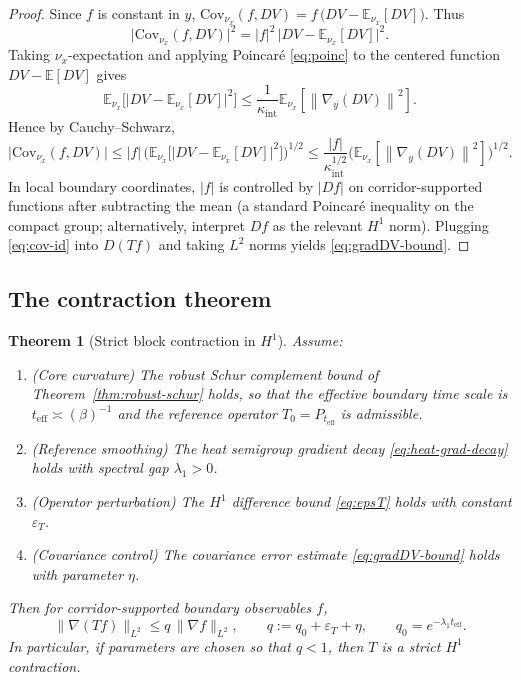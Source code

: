 \documentclass[11pt]{article}
\newtheorem{theorem}{Theorem}[section]
\theoremstyle{definition}
\newcommand{\E}{\mathbb{E}}
\newcommand{\Cov}{\mathrm{Cov}}
\newcommand{\1}{\mathbf{1}}
\newcommand{\norm}[1]{\left\lVert#1\right\rVert}
\begin{document}
\begin{proof}
Since $f$ is constant in $y$, $\Cov_{\nu_x}(f, DV)=f\,\big(DV-\E_{\nu_x}[DV]\big)$.
Thus
\[
\big|\Cov_{\nu_x}(f,DV)\big|^2
=|f|^2\,\big|DV-\E_{\nu_x}[DV]\big|^2.
\]
Taking $\nu_x$-expectation and applying Poincar\'e \eqref{eq:poinc} to the centered function $DV-\E[DV]$ gives
\[
\E_{\nu_x}\big[\big|DV-\E_{\nu_x}[DV]\big|^2\big]
\le \frac{1}{\kappa_{\mathrm{int}}}\E_{\nu_x}[\norm{\nabla_y(DV)}^2].
\]
Hence by Cauchy--Schwarz,
\[
\big|\Cov_{\nu_x}(f,DV)\big|
\le |f|\,\Big(\E_{\nu_x}\big[\big|DV-\E_{\nu_x}[DV]\big|^2\big]\Big)^{1/2}
\le \frac{|f|}{\kappa_{\mathrm{int}}^{1/2}}\Big(\E_{\nu_x}[\norm{\nabla_y(DV)}^2]\Big)^{1/2}.
\]
In local boundary coordinates, $|f|$ is controlled by $|Df|$ on corridor-supported functions after subtracting the mean (a standard Poincar\'e inequality on the compact group; alternatively, interpret $Df$ as the relevant $H^1$ norm). Plugging \eqref{eq:cov-id} into $D(Tf)$ and taking $L^2$ norms yields \eqref{eq:gradDV-bound}.
\end{proof}

\subsection{The contraction theorem}

\begin{theorem}[Strict block contraction in $H^1$]\label{thm:block-contract}
Assume:
\begin{enumerate}
\item (Core curvature) The robust Schur complement bound of Theorem~\ref{thm:robust-schur} holds, so that the effective boundary time scale is $t_{\mathrm{eff}}\asymp (\beta)^{-1}$ and the reference operator $T_0=P_{t_{\mathrm{eff}}}$ is admissible.
\item (Reference smoothing) The heat semigroup gradient decay \eqref{eq:heat-grad-decay} holds with spectral gap $\lambda_1>0$.
\item (Operator perturbation) The $H^1$ difference bound \eqref{eq:epsT} holds with constant $\varepsilon_T$.
\item (Covariance control) The covariance error estimate \eqref{eq:gradDV-bound} holds with parameter $\eta$.
\end{enumerate}
Then for corridor-supported boundary observables $f$,
\begin{equation}\label{eq:final-contract}
\|\nabla(Tf)\|_{L^2}\le q\,\|\nabla f\|_{L^2},
\qquad q:=q_0+\varepsilon_T+\eta,
\qquad q_0=e^{-\lambda_1 t_{\mathrm{eff}}}.
\end{equation}
In particular, if parameters are chosen so that $q<1$, then $T$ is a strict $H^1$ contraction.
\end{theorem}
\end{document}
